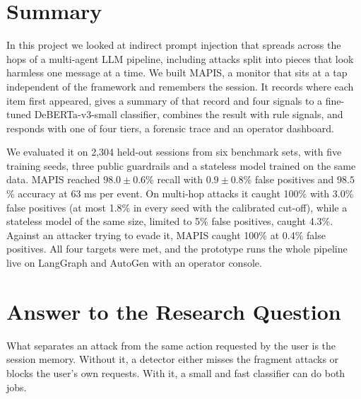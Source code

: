 \label{chap.8}
\section{Summary}
In this project we looked at indirect prompt injection that spreads across the hops of a multi-agent LLM pipeline, including attacks split into pieces that look harmless one message at a time. We built MAPIS, a monitor that sits at a tap independent of the framework and remembers the session. It records where each item first appeared, gives a summary of that record and four signals to a fine-tuned DeBERTa-v3-small classifier, combines the result with rule signals, and responds with one of four tiers, a forensic trace and an operator dashboard.

We evaluated it on 2,304 held-out sessions from six benchmark sets, with five training seeds, three public guardrails and a stateless model trained on the same data. MAPIS reached $98.0\pm0.6$\% recall with $0.9\pm0.8$\% false positives and $98.5$\% accuracy at 63 ms per event. On multi-hop attacks it caught 100\% with 3.0\% false positives (at most 1.8\% in every seed with the calibrated cut-off), while a stateless model of the same size, limited to 5\% false positives, caught 4.3\%. Against an attacker trying to evade it, MAPIS caught 100\% at 0.4\% false positives. All four targets were met, and the prototype runs the whole pipeline live on LangGraph and AutoGen with an operator console.

\section{Answer to the Research Question}
What separates an attack from the same action requested by the user is the session memory. Without it, a detector either misses the fragment attacks or blocks the user's own requests. With it, a small and fast classifier can do both jobs.

